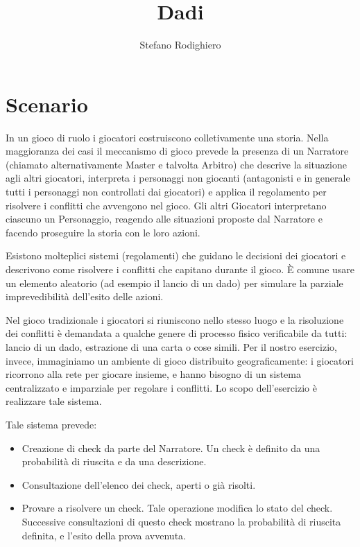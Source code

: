 \documentclass[a4paper]{article}
\author{Stefano Rodighiero}
\title{Dadi}
\begin{document}
\maketitle
\tableofcontents

\section{Scenario}

In un gioco di ruolo i giocatori costruiscono colletivamente una
storia. Nella maggioranza dei casi il meccanismo di gioco prevede la
presenza di un Narratore (chiamato alternativamente Master e talvolta
Arbitro) che descrive la situazione agli altri giocatori, interpreta i
personaggi non giocanti (antagonisti e in generale tutti i personaggi
non controllati dai giocatori) e applica il regolamento per risolvere
i conflitti che avvengono nel gioco. Gli altri Giocatori interpretano
ciascuno un Personaggio, reagendo alle situazioni proposte dal
Narratore e facendo proseguire la storia con le loro azioni.

Esistono molteplici sistemi (regolamenti) che guidano le decisioni dei
giocatori e descrivono come risolvere i conflitti che capitano durante
il gioco. \`E comune usare un elemento aleatorio (ad esempio il lancio
di un dado) per simulare la parziale imprevedibilit\`a dell'esito
delle azioni.

Nel gioco tradizionale i giocatori si riuniscono nello stesso luogo e
la risoluzione dei conflitti \`e demandata a qualche genere di
processo fisico verificabile da tutti: lancio di un dado, estrazione
di una carta o cose simili. Per il nostro esercizio, invece,
immaginiamo un ambiente di gioco distribuito geograficamente: i
giocatori ricorrono alla rete per giocare insieme, e hanno bisogno di
un sistema centralizzato e imparziale per regolare i conflitti. Lo
scopo dell'esercizio \`e realizzare tale sistema.

Tale sistema prevede:

\begin{itemize}
\item Creazione di check da parte del Narratore. Un check \`e
  definito da una probabilit\`a di riuscita e da una descrizione.
\item Consultazione dell'elenco dei check, aperti o gi\`a risolti.
\item Provare a risolvere un check. Tale operazione modifica lo stato
  del check. Successive consultazioni di questo check mostrano la
  probabilit\`a di riuscita definita, e l'esito della prova avvenuta.
\end{itemize}
\end{document}
